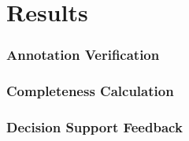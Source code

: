\chapter{Results}

\subsection{Annotation Verification}

\subsection{Completeness Calculation}


\subsection{Decision Support Feedback}